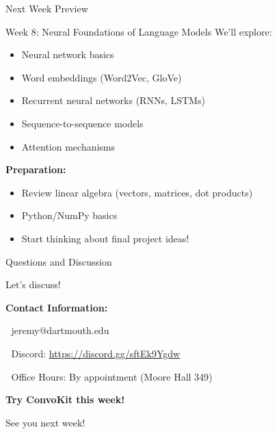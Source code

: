 \documentclass[aspectratio=169]{beamer}
\begin{document}
\begin{frame}[shrink=10]{Next Week Preview 🔮}
\small
    \begin{block}{Week 8: Neural Foundations of Language Models}
        We'll explore:
        \begin{itemize}\setlength{\itemsep}{0pt}
            \item Neural network basics
            \item Word embeddings (Word2Vec, GloVe)
            \item Recurrent neural networks (RNNs, LSTMs)
            \item Sequence-to-sequence models
            \item Attention mechanisms
        \end{itemize}
    \end{block}

    \vspace{0.3cm}

    \textbf{Preparation:}
    \begin{itemize}\setlength{\itemsep}{0pt}
        \item Review linear algebra (vectors, matrices, dot products)
        \item Python/NumPy basics
        \item Start thinking about final project ideas!
    \end{itemize}
\end{frame}

\begin{frame}{Questions and Discussion 💬}
    \begin{center}
        \Large{Let's discuss!}

        \vspace{0.5cm}

        \textbf{Contact Information:}

        📧 jeremy@dartmouth.edu

        💬 Discord: \href{https://discord.gg/sftEk9Ygdw}{https://discord.gg/sftEk9Ygdw}

        🏢 Office Hours: By appointment (Moore Hall 349)

        \vspace{0.5cm}

        \textbf{Try ConvoKit this week!} 🔬

        \vspace{0.3cm}

        \large{See you next week! 🚀}
    \end{center}
\end{frame}
\end{document}
